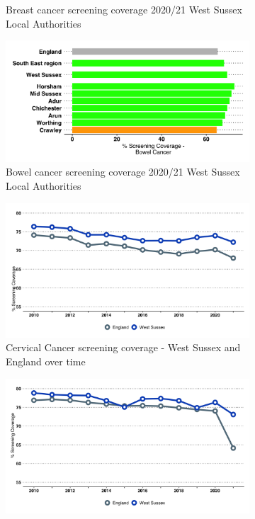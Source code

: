 \begin{figure}
\begin{subfigure}[b]{0.32\textwidth}
        \caption{Breast cancer screening coverage 2020/21 West Sussex Local Authorities}
        \label{fig:breast:rag}
    \end{subfigure}
    \begin{subfigure}[b]{0.32\textwidth}
        \centering
        \includegraphics[width=\textwidth]{images/bowel_cancer_rag_bar.png}
        \caption{Bowel cancer screening coverage 2020/21 West Sussex Local Authorities}
        \label{fig:bowel:rag}
    \end{subfigure}
    \begin{subfigure}[b]{0.32\textwidth}
        \centering
        \includegraphics[width=\textwidth]{images/cervical_cancer_screening.png}
        \caption{Cervical Cancer screening coverage - West Sussex and England over time}
        \label{fig:cervical:time}
    \end{subfigure}
    \begin{subfigure}[b]{0.32\textwidth}
        \centering
        \includegraphics[width=\textwidth]{images/breast_cancer_screening.png}

\end{subfigure}
\end{figure}
